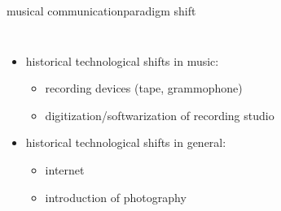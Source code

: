 \begin{frame}{musical communication}{paradigm shift}
    \vspace{-5mm}
    \begin{columns}
    
        \begin{itemize}
            \item historical technological shifts in music:
                \begin{itemize}
                    \item recording devices (tape, grammophone)
                    \item digitization/softwarization of recording studio
                \end{itemize}
            \smallskip
            \item historical technological shifts in general:
                \begin{itemize}
                    \item internet
                    \item introduction of photography
                \end{itemize}
        \end{itemize}
        \smallskip
    

\end{columns}
\end{frame}
